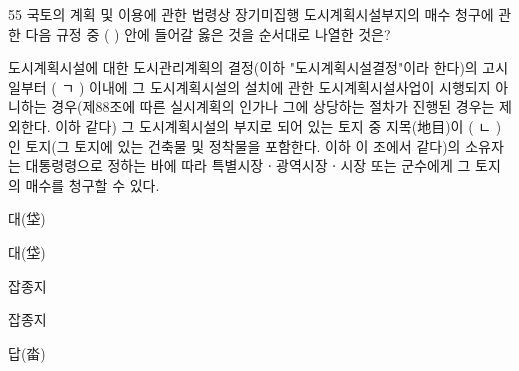 \begin{question}{55}
국토의 계획 및 이용에 관한 법령상 장기미집행 도시계획시설부지의 매수 청구에 관한 다음 규정 중 ( ) 안에 들어갈 옳은 것을 순서대로 나열한 것은?
\begin{bogi}[다 음]
도시계획시설에 대한 도시관리계획의 결정(이하 "도시계획시설결정"이라 한다)의 고시일부터 ( ㄱ ) 이내에 그 도시계획시설의 설치에 관한 도시계획시설사업이 시행되지 아니하는 경우(제88조에 따른 실시계획의 인가나 그에 상당하는 절차가 진행된 경우는 제외한다. 이하 같다) 그 도시계획시설의 부지로 되어 있는 토지 중 지목(地目)이 ( ㄴ )인 토지(그 토지에 있는 건축물 및 정착물을 포함한다. 이하 이 조에서 같다)의 소유자는 대통령령으로 정하는 바에 따라 특별시장ㆍ광역시장ㆍ시장 또는 군수에게 그 토지의 매수를 청구할 수 있다. \par
\end{bogi}
\par\noindent\hspace{2em}\uline{}\quad\uline{}\par
\begin{choices}
  \item {}\quad 대(垈)
  \item {}\quad 대(垈)
  \item {}\quad 잡종지
  \item {}\quad 잡종지
  \item {}\quad 답(畓)
\end{choices}
\end{question}
